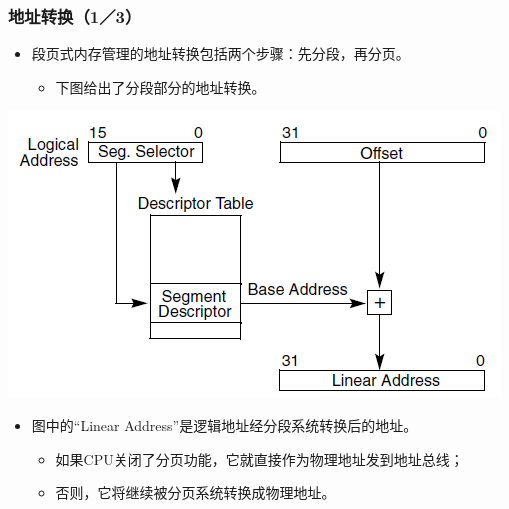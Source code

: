 \documentclass[CJKutf8,xcolor=pdftex,dvipsnames,table]{beamer}
\begin{document}
\begin{CJK*}{UTF8}{song}
  \begin{frame}
  \frametitle{地址转换（1／3）} \pause
  \begin{itemize}
  \item{段页式内存管理的地址转换包括两个步骤：先分段，再分页。} \pause
    \begin{itemize}
    \item{下图给出了分段部分的地址转换。} \pause
    \end{itemize}
  \end{itemize}
  \begin{center}
    \includegraphics[scale=.5]{x86atl2l} \pause
  \end{center}
  \begin{itemize}
  \item{图中的“Linear Address”是逻辑地址经分段系统转换后的地址。} \pause
    \begin{itemize}
    \item{如果CPU关闭了分页功能，它就直接作为物理地址发到地址总线；} \pause
    \item{否则，它将继续被分页系统转换成物理地址。}
    \end{itemize}
  \end{itemize}
  \end{frame}
  

\end{CJK*}
\end{document}

